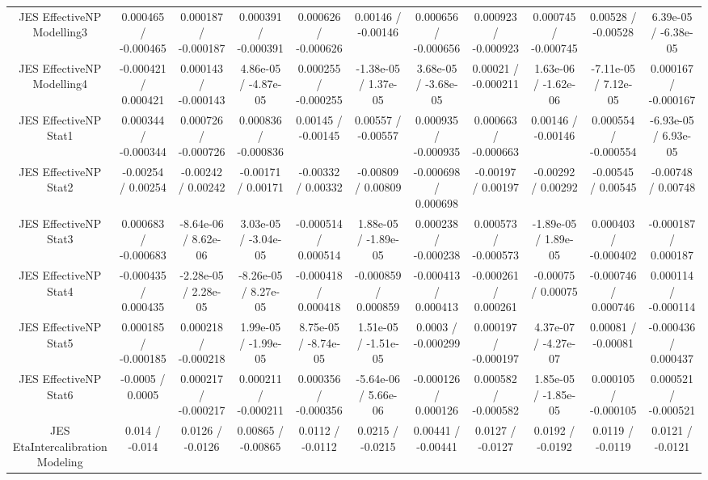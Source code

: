\begin{table}[htbp]
\begin{center}
\begin{tabular}{|c|c|c|c|c|c|c|c|c|c|c|}
  JES EffectiveNP Modelling3 & 0.000465 / -0.000465 & 0.000187 / -0.000187 & 0.000391 / -0.000391 & 0.000626 / -0.000626 & 0.00146 / -0.00146 & 0.000656 / -0.000656 & 0.000923 / -0.000923 & 0.000745 / -0.000745 & 0.00528 / -0.00528 & 6.39e-05 / -6.38e-05 \\ 
  JES EffectiveNP Modelling4 & -0.000421 / 0.000421 & 0.000143 / -0.000143 & 4.86e-05 / -4.87e-05 & 0.000255 / -0.000255 & -1.38e-05 / 1.37e-05 & 3.68e-05 / -3.68e-05 & 0.00021 / -0.000211 & 1.63e-06 / -1.62e-06 & -7.11e-05 / 7.12e-05 & 0.000167 / -0.000167 \\ 
  JES EffectiveNP Stat1 & 0.000344 / -0.000344 & 0.000726 / -0.000726 & 0.000836 / -0.000836 & 0.00145 / -0.00145 & 0.00557 / -0.00557 & 0.000935 / -0.000935 & 0.000663 / -0.000663 & 0.00146 / -0.00146 & 0.000554 / -0.000554 & -6.93e-05 / 6.93e-05 \\ 
  JES EffectiveNP Stat2 & -0.00254 / 0.00254 & -0.00242 / 0.00242 & -0.00171 / 0.00171 & -0.00332 / 0.00332 & -0.00809 / 0.00809 & -0.000698 / 0.000698 & -0.00197 / 0.00197 & -0.00292 / 0.00292 & -0.00545 / 0.00545 & -0.00748 / 0.00748 \\ 
  JES EffectiveNP Stat3 & 0.000683 / -0.000683 & -8.64e-06 / 8.62e-06 & 3.03e-05 / -3.04e-05 & -0.000514 / 0.000514 & 1.88e-05 / -1.89e-05 & 0.000238 / -0.000238 & 0.000573 / -0.000573 & -1.89e-05 / 1.89e-05 & 0.000403 / -0.000402 & -0.000187 / 0.000187 \\ 
  JES EffectiveNP Stat4 & -0.000435 / 0.000435 & -2.28e-05 / 2.28e-05 & -8.26e-05 / 8.27e-05 & -0.000418 / 0.000418 & -0.000859 / 0.000859 & -0.000413 / 0.000413 & -0.000261 / 0.000261 & -0.00075 / 0.00075 & -0.000746 / 0.000746 & 0.000114 / -0.000114 \\ 
  JES EffectiveNP Stat5 & 0.000185 / -0.000185 & 0.000218 / -0.000218 & 1.99e-05 / -1.99e-05 & 8.75e-05 / -8.74e-05 & 1.51e-05 / -1.51e-05 & 0.0003 / -0.000299 & 0.000197 / -0.000197 & 4.37e-07 / -4.27e-07 & 0.00081 / -0.00081 & -0.000436 / 0.000437 \\ 
  JES EffectiveNP Stat6 & -0.0005 / 0.0005 & 0.000217 / -0.000217 & 0.000211 / -0.000211 & 0.000356 / -0.000356 & -5.64e-06 / 5.66e-06 & -0.000126 / 0.000126 & 0.000582 / -0.000582 & 1.85e-05 / -1.85e-05 & 0.000105 / -0.000105 & 0.000521 / -0.000521 \\ 
  JES EtaIntercalibration Modeling & 0.014 / -0.014 & 0.0126 / -0.0126 & 0.00865 / -0.00865 & 0.0112 / -0.0112 & 0.0215 / -0.0215 & 0.00441 / -0.00441 & 0.0127 / -0.0127 & 0.0192 / -0.0192 & 0.0119 / -0.0119 & 0.0121 / -0.0121 \\ 

\end{tabular}
\end{center}
\end{table}
